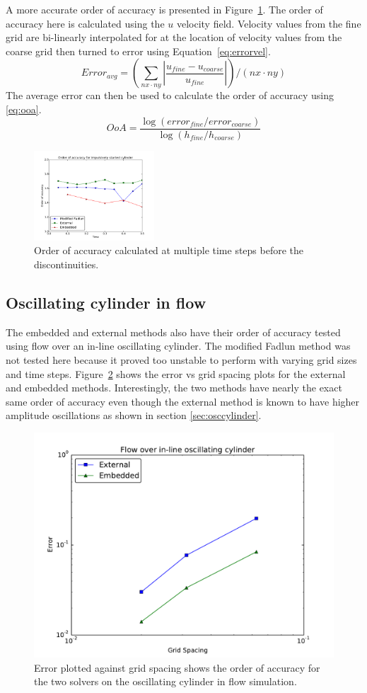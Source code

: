 A more accurate order of accuracy is presented in Figure~\ref{fig:cyerror2}. 
The order of accuracy here is calculated using the $u$ velocity field. 
Velocity values from the fine grid are bi-linearly interpolated for at the location of velocity values from the coarse grid then turned to error using Equation~\eqref{eq:errorvel}.
\begin{equation}
Error_{avg}=\left(\sum_{nx\cdot ny}^{} \left|\frac{u_{fine}-u_{coarse}}{u_{fine}}\right|\right)/(nx\cdot ny)
\label{eq:errorvel}
\end{equation}
The average error can then be used to calculate the order of accuracy using \eqref{eq:ooa}. 
\begin{equation}
OoA = \frac{\log \left(error_{fine}/error_{coarse}\right)}{\log \left(h_{fine}/h_{coarse}\right)}\label{eq:ooa}
\end{equation}

\begin{figure}[!htb]
	\centering
	\includegraphics[width=0.4\textwidth]{error_order_2_plt}
	\caption{Order of accuracy calculated at multiple time steps before the discontinuities.}
	\label{fig:cyerror2}
\end{figure}

\subsection{Oscillating cylinder in flow}
The embedded and external methods also have their order of accuracy tested using flow over an in-line oscillating cylinder.
The modified Fadlun method was not tested here because it proved too unstable to perform with varying grid sizes and time steps.
Figure~\ref{fig:oscerror} shows the error vs grid spacing plots for the external and embedded methods. 
Interestingly, the two methods have nearly the exact same order of accuracy even though the external method is known to have higher amplitude oscillations as shown in section \ref{sec:osccylinder}. 

\begin{figure}[!htb]
	\centering
	\includegraphics[width=0.4\linewidth]{error_oscflow}
	\caption{Error plotted against grid spacing shows the order of accuracy for the two solvers on the oscillating cylinder in flow simulation.}
	\label{fig:oscerror}
\end{figure}

